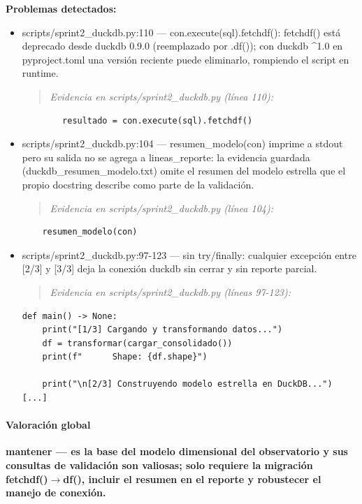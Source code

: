 \begin{tcolorbox}[riesgo]
\textbf{Problemas detectados:}
\begin{itemize}
  \item scripts/sprint2\_duckdb.py:110 --- con.execute(sql).fetchdf(): fetchdf() está deprecado desde duckdb 0.9.0 (reemplazado por .df()); con duckdb \textasciicircum{}1.0 en pyproject.toml una versión reciente puede eliminarlo, rompiendo el script en runtime.
\begin{quote}\footnotesize\ttfamily
\noindent\emph{Evidencia en scripts/sprint2\_duckdb.py (línea 110):}
\end{quote}
\begin{lstlisting}
        resultado = con.execute(sql).fetchdf()
\end{lstlisting}

  \item scripts/sprint2\_duckdb.py:104 --- resumen\_modelo(con) imprime a stdout pero su salida no se agrega a lineas\_reporte: la evidencia guardada (duckdb\_resumen\_modelo.txt) omite el resumen del modelo estrella que el propio docstring describe como parte de la validación.
\begin{quote}\footnotesize\ttfamily
\noindent\emph{Evidencia en scripts/sprint2\_duckdb.py (línea 104):}
\end{quote}
\begin{lstlisting}
    resumen_modelo(con)
\end{lstlisting}

  \item scripts/sprint2\_duckdb.py:97-123 --- sin try/finally: cualquier excepción entre [2/3] y [3/3] deja la conexión duckdb sin cerrar y sin reporte parcial.
\begin{quote}\footnotesize\ttfamily
\noindent\emph{Evidencia en scripts/sprint2\_duckdb.py (líneas 97-123):}
\end{quote}
\begin{lstlisting}
def main() -> None:
    print("[1/3] Cargando y transformando datos...")
    df = transformar(cargar_consolidado())
    print(f"      Shape: {df.shape}")

    print("\n[2/3] Construyendo modelo estrella en DuckDB...")
[...]
\end{lstlisting}

\end{itemize}
\end{tcolorbox}

\paragraph{Valoración global}
\textbf{mantener --- es la base del modelo dimensional del observatorio y sus consultas de validación son valiosas; solo requiere la migración fetchdf()$\rightarrow$df(), incluir el resumen en el reporte y robustecer el manejo de conexión.}


